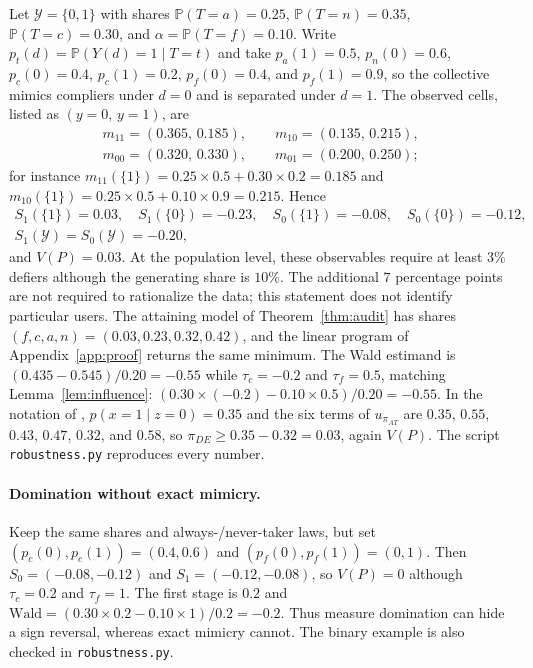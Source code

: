 \documentclass{article}
\theoremstyle{remark}
\newcommand{\Prob}{\mathbb{P}}
\newcommand{\Yspace}{\mathcal{Y}}
\newcommand{\Wald}{\mathrm{Wald}}
\begin{document}
Let $\Yspace=\{0,1\}$ with shares $\Prob(T=a)=0.25$, $\Prob(T=n)=0.35$, $\Prob(T=c)=0.30$, and $\alpha=\Prob(T=f)=0.10$. Write $p_t(d)=\Prob(Y(d){=}1\mid T{=}t)$ and take $p_a(1)=0.5$, $p_n(0)=0.6$, $p_c(0)=0.4$, $p_c(1)=0.2$, $p_f(0)=0.4$, and $p_f(1)=0.9$, so the collective mimics compliers under $d=0$ and is separated under $d=1$. The observed cells, listed as $(y{=}0,\,y{=}1)$, are
\begin{gather*}
m_{11}=(0.365,\,0.185),\qquad m_{10}=(0.135,\,0.215),\\
m_{00}=(0.320,\,0.330),\qquad m_{01}=(0.200,\,0.250);
\end{gather*}
for instance $m_{11}(\{1\})=0.25\times0.5+0.30\times0.2=0.185$ and $m_{10}(\{1\})=0.25\times0.5+0.10\times0.9=0.215$. Hence
\begin{gather*}
S_1(\{1\})=0.03,\quad S_1(\{0\})=-0.23,\quad S_0(\{1\})=-0.08,\quad S_0(\{0\})=-0.12,\\
S_1(\Yspace)=S_0(\Yspace)=-0.20,
\end{gather*}
and $V(P)=0.03$. At the population level, these observables require at least $3\%$ defiers although the generating share is $10\%$. The additional $7$ percentage points are not required to rationalize the data; this statement does not identify particular users. The attaining model of Theorem~\ref{thm:audit} has shares $(f,c,a,n)=(0.03,0.23,0.32,0.42)$, and the linear program of Appendix~\ref{app:proof} returns the same minimum. The Wald estimand is $(0.435-0.545)/0.20=-0.55$ while $\tau_c=-0.2$ and $\tau_f=0.5$, matching Lemma~\ref{lem:influence}: $(0.30\times(-0.2)-0.10\times0.5)/0.20=-0.55$. In the notation of \citet{richardson2010binary}, $p(x{=}1\mid z{=}0)=0.35$ and the six terms of $u_{\pi_{AT}}$ are $0.35$, $0.55$, $0.43$, $0.47$, $0.32$, and $0.58$, so $\pi_{DE}\ge0.35-0.32=0.03$, again $V(P)$. The script \texttt{robustness.py} reproduces every number.

\paragraph{Domination without exact mimicry.}
Keep the same shares and always-/never-taker laws, but set
$(p_c(0),p_c(1))=(0.4,0.6)$ and $(p_f(0),p_f(1))=(0,1)$.
Then $S_0=(-0.08,-0.12)$ and $S_1=(-0.12,-0.08)$, so $V(P)=0$ although
$\tau_c=0.2$ and $\tau_f=1$. The first stage is $0.2$ and
$\Wald=(0.30\times0.2-0.10\times1)/0.2=-0.2$.
Thus measure domination can hide a sign reversal, whereas exact mimicry
cannot. The binary example is also checked in \texttt{robustness.py}.
\end{document}
